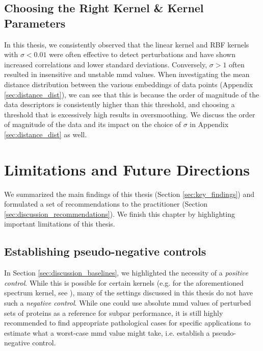 \subsection{Choosing the Right Kernel \& Kernel Parameters}
In this thesis, we consistently observed that the linear kernel and RBF kernels
with $\sigma<0.01$ were often effective to detect perturbations and have shown
increased correlations and lower standard deviations. Conversely, $\sigma>1$
often resulted in insensitive and unstable \acrshort{mmd} values. When
investigating the mean distance distribution between the various embeddings of
data points (Appendix \ref{sec:distance_dist}), we can see that this is because
the order of magnitude of the data descriptors is consistently higher than this
threshold, and choosing a threshold that is excessively high results in
oversmoothing. We discuss the order of magnitude of the data and its impact on
the choice of $\sigma$ in Appendix \ref{sec:distance_dist} as well.

\section{Limitations and Future Directions}\label{sec:discussion_limitations}

We summarized the main findings of this thesis (Section \ref{sec:key_findings})
and formulated a set of recommendations to the practitioner (Section
\ref{sec:discussion_recommendations}). We finish this chapter by highlighting
important limitations of this thesis.


\subsection{Establishing pseudo-negative controls}

In Section \ref{sec:discussion_baselines}, we highlighted the necessity of a
\emph{positive control}. While this is possible for certain kernels (e.g. for
the aforementioned spectrum kernel, see \cite{kucera2022conditional}), many of
the settings discussed in this thesis do not have such a \emph{negative control}.
While one could use absolute \acrshort{mmd} values of perturbed sets of proteins
as a reference for subpar performance, it is still highly recommended to find
appropriate pathological cases for specific applications to estimate what a
worst-case \acrshort{mmd} value might take, i.e. establish a pseudo-negative control.

